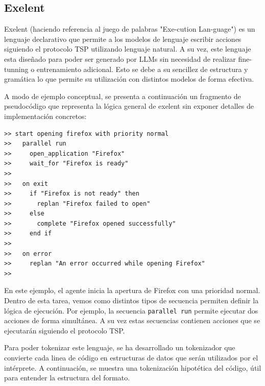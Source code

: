 \subsection{Exelent}
Exelent (haciendo referencia al juego de palabras "Exe-cution Lan-guage") es un
lenguaje declarativo que permite a los modelos de lenguaje escribir acciones
siguiendo el protocolo TSP utilizando lenguaje natural. A su vez, este lenguaje
esta diseñado para poder ser generado por LLMs sin necesidad de realizar
fine-tunning o entrenamiento adicional. Esto se debe a su sencillez de
estructura y gramática lo que permite su utilización con distintos modelos de
forma efectiva.


A modo de ejemplo conceptual, se presenta a continuación un fragmento de
pseudocódigo que representa la lógica general de exelent sin exponer
detalles de implementación concretos:

\begin{lstlisting}[caption={Fragmento de pseudocódigo Exelent}, label={cod:exelent_example}]
>> start opening firefox with priority normal
>>   parallel run
>>     open_application "Firefox"
>>     wait_for "Firefox is ready"
>>
>>   on exit
>>     if "Firefox is not ready" then
>>       replan "Firefox failed to open"
>>     else
>>       complete "Firefox opened successfully"
>>     end if
>>
>>   on error
>>     replan "An error occurred while opening Firefox"
>>
\end{lstlisting}

En este ejemplo, el agente inicia la apertura de Firefox con una prioridad 
normal. Dentro de esta tarea, vemos como distintos tipos de secuencia permiten
definir la lógica de ejecución. Por ejemplo, la secuencia \texttt{parallel run} permite
ejecutar dos acciones de forma simultánea. A su vez estas secuencias contienen 
acciones que se ejecutarán siguiendo el protocolo TSP.

Para poder tokenizar este lenguaje, se ha desarrollado un tokenizador que 
convierte cada linea de código en estructuras de datos que serán utilizados 
por el intérprete. A continuación, se muestra una tokenización hipotética del
código, útil para entender la estructura del formato.

